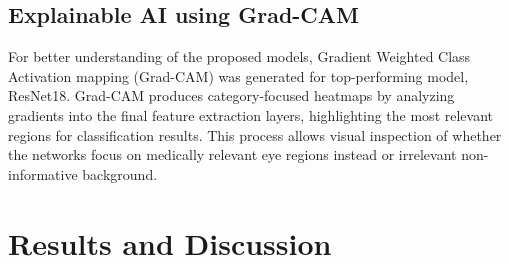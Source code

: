 \documentclass[conference,9pt]{IEEEtran}
\begin{document}
\subsection{\textbf{Explainable AI using Grad-CAM}}
For better understanding of the proposed models, Gradient Weighted Class Activation mapping (Grad-CAM) was generated for top-performing model, ResNet18. Grad-CAM produces category-focused heatmaps by analyzing gradients into the final feature extraction layers, highlighting the most relevant regions for classification results. This process allows visual inspection of whether the networks focus on medically relevant eye regions instead or irrelevant non-informative background. 

\section{\textbf{Results and Discussion}}
\end{document}
